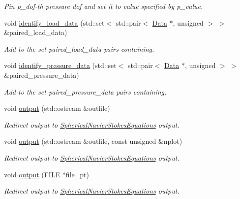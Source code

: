 \begin{DoxyCompactItemize}
\begin{DoxyCompactList}\small\item\em Pin p\+\_\+dof-\/th pressure dof and set it to value specified by p\+\_\+value. \end{DoxyCompactList}\item 
void \hyperlink{classoomph_1_1QSphericalTaylorHoodElement_a3f964db0b1ca6e1edd0c2b450b79af6d}{identify\+\_\+load\+\_\+data} (std\+::set$<$ std\+::pair$<$ \hyperlink{classoomph_1_1Data}{Data} $\ast$, unsigned $>$ $>$ \&paired\+\_\+load\+\_\+data)
\begin{DoxyCompactList}\small\item\em Add to the set {\ttfamily paired\+\_\+load\+\_\+data} pairs containing. \end{DoxyCompactList}\item 
void \hyperlink{classoomph_1_1QSphericalTaylorHoodElement_a53b2b394a10a6a415a79c3d53aaf2a51}{identify\+\_\+pressure\+\_\+data} (std\+::set$<$ std\+::pair$<$ \hyperlink{classoomph_1_1Data}{Data} $\ast$, unsigned $>$ $>$ \&paired\+\_\+pressure\+\_\+data)
\begin{DoxyCompactList}\small\item\em Add to the set {\ttfamily paired\+\_\+pressure\+\_\+data} pairs containing. \end{DoxyCompactList}\item 
void \hyperlink{classoomph_1_1QSphericalTaylorHoodElement_af3864809dfd77246f0ec052480ac397f}{output} (std\+::ostream \&outfile)
\begin{DoxyCompactList}\small\item\em Redirect output to \hyperlink{classoomph_1_1SphericalNavierStokesEquations}{Spherical\+Navier\+Stokes\+Equations} output. \end{DoxyCompactList}\item 
void \hyperlink{classoomph_1_1QSphericalTaylorHoodElement_ac4e26ba768ccacbcd5144d34219690b0}{output} (std\+::ostream \&outfile, const unsigned \&nplot)
\begin{DoxyCompactList}\small\item\em Redirect output to \hyperlink{classoomph_1_1SphericalNavierStokesEquations}{Spherical\+Navier\+Stokes\+Equations} output. \end{DoxyCompactList}\item 
void \hyperlink{classoomph_1_1QSphericalTaylorHoodElement_aa45522c214c7cb5ff01724ebafe988c6}{output} (F\+I\+LE $\ast$file\+\_\+pt)
\begin{DoxyCompactList}\small\item\em Redirect output to \hyperlink{classoomph_1_1SphericalNavierStokesEquations}{Spherical\+Navier\+Stokes\+Equations} output. \end{DoxyCompactList}\item 

\end{DoxyCompactItemize}
